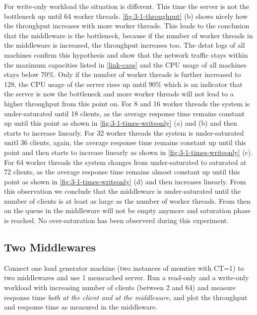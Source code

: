 \documentclass[11pt,a4paper]{article}
\begin{document}
For write-only workload the situation is different. This time the server is not the bottleneck up until 64 worker threads. \autoref{fig:3-1-throughput} (b) shows nicely how the throughput increases with more worker threads. This leads to the conclusion that the middleware is the bottleneck, because if the number of worker threads in the middleware is increased, the throughput increases too. The dstat logs of all machines confirm this hypothesis and show that the network traffic stays within the maximum capacities listed in \autoref{link-caps} and the CPU usage of all machines stays below 70\%.
Only if the number of worker threads is further increased to 128, the CPU usage of the server rises up until 90\% which is an indicator that the server is now the bottleneck and more worker threads will not lead to a higher throughput from this point on.
For 8 and 16 worker threads the system is under-saturated until 18 clients, as the average response time remains constant up until this point as shown in \autoref{fig:3-1-times-writeonly} (a) and (b) and then starts to increase linearly.
For 32 worker threads the system is under-saturated unitl 36 clients, again, the average response time remains constant up until this point and then starts to increase linearly as shown in \autoref{fig:3-1-times-writeonly} (c).
For 64 worker threads the system changes from under-saturated to saturated at 72 clients, as the average response time remains almost constant up until this point as shown in \autoref{fig:3-1-times-writeonly} (d) and then increases linearly.
From this observation we conclude that the middleware is under-saturated until the number of clients is at least as large as the number of worker threads. From then on the queue in the middleware will not be empty anymore and saturation phase is reached.
No over-saturation has been observerd during this experiment.



\subsection{Two Middlewares} \label{sec3.2}

Connect one load generator machine (two instances of memtier with CT=1) to two middlewares and use 1 memcached server. Run a read-only and a write-only workload with increasing number of clients (between 2 and 64) and measure response time \emph{both at the client and at the middleware}, and plot the throughput and response time as measured in the middleware.
\end{document}
